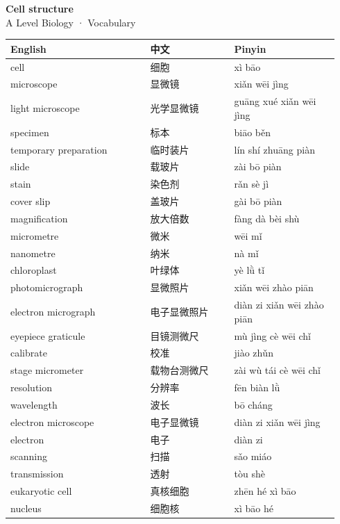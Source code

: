 \documentclass[11pt]{article}
\begin{document}
\begin{center}
  {\LARGE\bfseries Cell structure}\\[0.35em]
  {\large A Level Biology · Vocabulary}
\end{center}
\vspace{0.6em}

\begin{longtable}{@{}p{0.40\linewidth}p{0.24\linewidth}p{0.30\linewidth}@{}}
\toprule
\textbf{English} & \textbf{中文} & \textbf{Pinyin} \\
\midrule
\endhead
\bottomrule
\endlastfoot
cell & 细胞 & xì bāo \\
microscope & 显微镜 & xiǎn wēi jìng \\
light microscope & 光学显微镜 & guāng xué xiǎn wēi jìng \\
specimen & 标本 & biāo běn \\
temporary preparation & 临时装片 & lín shí zhuāng piàn \\
slide & 载玻片 & zài bō piàn \\
stain & 染色剂 & rǎn sè jì \\
cover slip & 盖玻片 & gài bō piàn \\
magnification & 放大倍数 & fàng dà bèi shù \\
micrometre & 微米 & wēi mǐ \\
nanometre & 纳米 & nà mǐ \\
chloroplast & 叶绿体 & yè lǜ tǐ \\
photomicrograph & 显微照片 & xiǎn wēi zhào piān \\
electron micrograph & 电子显微照片 & diàn zi xiǎn wēi zhào piān \\
eyepiece graticule & 目镜测微尺 & mù jìng cè wēi chǐ \\
calibrate & 校准 & jiào zhǔn \\
stage micrometer & 载物台测微尺 & zài wù tái cè wēi chǐ \\
resolution & 分辨率 & fēn biàn lǜ \\
wavelength & 波长 & bō cháng \\
electron microscope & 电子显微镜 & diàn zi xiǎn wēi jìng \\
electron & 电子 & diàn zi \\
scanning & 扫描 & sǎo miáo \\
transmission & 透射 & tòu shè \\
eukaryotic cell & 真核细胞 & zhēn hé xì bāo \\
nucleus & 细胞核 & xì bāo hé \\

\end{longtable}
\end{document}

